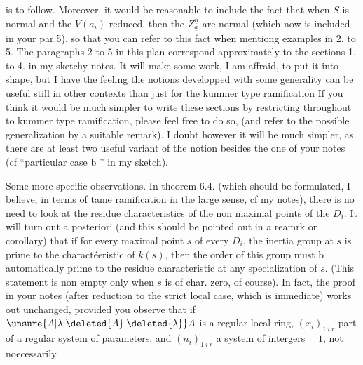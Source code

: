 is to follow. Moreover, it would be reasonable to include the fact that when $S$ is normal and the $V(a_i)$ reduced, then the $Z^{\underline{n}}_{\underline{a}}$ are normal (which now is included in your par.5), so that you can refer to this fact when mentiong examples in  2. to 5. The paragraphs 2 to 5 in this plan correspond approximately to the sections 1. to 4. in my sketchy notes. It will make some work, I am affraid, to put it into shape, but I have the feeling the notions developped with some generality can be useful still in other contexts than just for the kummer type ramification
If you think it would be much simpler to write these sections by restricting throughout to kummer type ramification, please feel free to do so, (and refer to the possible generalization by a suitable remark). I doubt however it will be much simpler, as there are at least two useful variant
of the notion besides the one of your notes (cf ``particular case b '' in my sketch).

Some more specific observations. In theorem 6.4. (which should be formulated, I believe, in terms of tame ramification in the large sense, cf my notes), there is no need to look at the residue characteristics of the non maximal points of the $D_i$. It will turn out a posteriori (and this should be pointed out in a reamrk or corollary) that  if for every maximal point $s$ of every $D_i$, the inertia group at $s$ is prime to the charactéeristic of $k(s)$, then the order of this group must b automatically prime to the residue characteristic at any specialization of $s$. (This statement is non empty only when $s$ is of char. zero, of course). In fact, the proof in your notes (after reduction to the strict local case, which is immediate) works out unchanged, provided you observe that if $\unsure{A|\lambda|\deleted{A}|\deleted{\lambda}}A$ is a regular local ring, $(x_i)_{1\ i\ r}$ part of a regular system of parameters, and $(n_i)_{1\ i\ r}$ a system of intergers $\quad1$, not noecessarily
